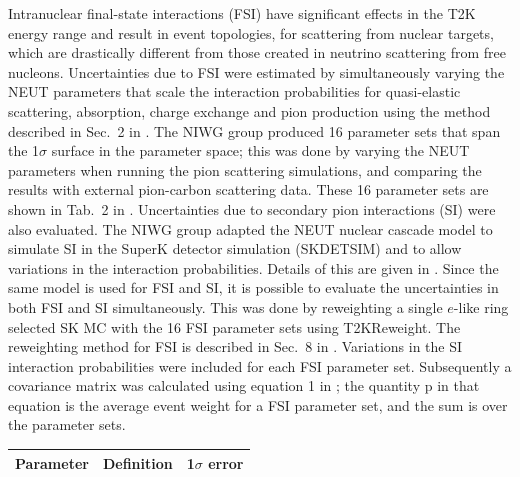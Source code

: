 \begin{enumerate}
Intranuclear final-state interactions (FSI) have significant effects in the T2K energy range and
result in event topologies, for scattering from nuclear targets, which are drastically different from
those created in neutrino scattering from free nucleons.
Uncertainties due to FSI were estimated by simultaneously varying the NEUT parameters that scale the interaction probabilities for quasi-elastic
scattering, absorption, charge exchange and pion production using the method described in Sec.\ 2 in \cite{NIWGErr}. The NIWG group produced 16
parameter sets that span the 1$\sigma$ surface in the parameter space; this was done by varying the NEUT parameters when running the pion scattering
simulations, and comparing the results with external pion-carbon scattering data. These 16 parameter sets are shown in Tab.\ 2 in \cite{NIWGErr}.
Uncertainties due to secondary pion interactions (SI) were also evaluated. The NIWG group adapted the NEUT nuclear cascade model to simulate SI in the
SuperK detector simulation (SKDETSIM) and to allow variations in the interaction probabilities. Details of this are given in \cite{SI}.
Since the same model is used for FSI and SI, it is possible to evaluate the uncertainties in both FSI and SI simultaneously. This was done by
reweighting a single $e$-like ring selected SK MC with the 16 FSI parameter sets using T2KReweight. The reweighting method for FSI is described
in Sec.\ 8 in \cite{NEUTnuclear}. Variations in the SI interaction probabilities were included for each FSI parameter set.  Subsequently a covariance
matrix was calculated using equation 1 in \cite{NIWGErr}; the quantity p in that equation is the average event weight for a FSI parameter set, and
the sum is over the parameter sets.




{
\renewcommand{\arraystretch}{1.5}



\begin{table}
\centering
\begin{tabular}{| c | c | c |}
\hline
 Parameter               &  Definition  &  1$\sigma$ error   \\
\hline


\end{tabular}
\end{table}}
\end{enumerate}
